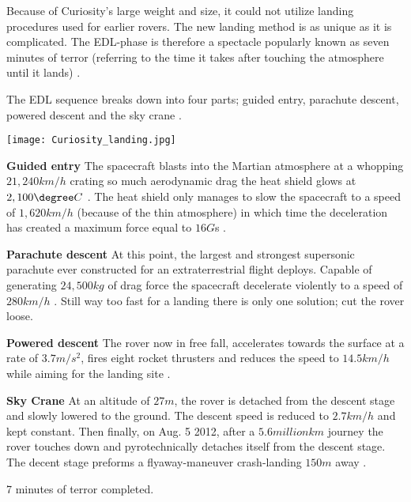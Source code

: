 ﻿\begin{tcolorbox}[colback=red!5,colframe=DarkRed!40!black,title=Entry, Decent and Landing (EDL)]
Because of Curiosity’s large weight and size, it could not utilize landing procedures used for earlier rovers.
The new landing method is as unique as it is complicated.
The EDL-phase is therefore a spectacle popularly known as seven minutes of terror (referring to the time it takes after touching the atmosphere until it lands) \cite{CNN_7minterror}. 

The EDL sequence breaks down into four parts; guided entry, parachute descent, powered descent and the sky crane \cite{NASALanding}.

{\centering
\texttt{[image: Curiosity\_landing.jpg]}
\par}

\textbf{Guided entry}
The spacecraft blasts into the Martian atmosphere at a whopping $21,240km/h$ crating so much aerodynamic drag the heat shield glows at $2,100\degree C$ \cite{NASA_youtube}.
The heat shield only manages to slow the spacecraft to a speed of $1,620km/h$ (because of the thin atmosphere) in which time the deceleration has created a maximum force equal to $16G$s \cite{HistoricLanding} \cite{NASALanding}.

\textbf{Parachute descent}
At this point, the largest and strongest supersonic parachute ever constructed for an extraterrestrial flight deploys. Capable of generating $24,500kg$ of drag force the spacecraft decelerate violently to a speed of $280km/h$ \cite{Parachute} \cite{NASALanding}.
Still way too fast for a landing there is only one solution; cut the rover loose.

\textbf{Powered descent}
The rover now in free fall, accelerates towards the surface at a rate of $3.7m/s^{2}$, fires eight rocket thrusters and reduces the speed to $14.5km/h$ while aiming for the landing site \cite{HistoricLanding} \cite{NASALanding}. 

\textbf{Sky Crane}
At an altitude of $27m$, the rover is detached from the descent stage and slowly lowered to the ground.
The descent speed is reduced to $2.7km/h$ and kept constant.
Then finally, on Aug. 5 2012, after a $5.6 million km$ \cite{CNNCuriosity} journey the rover touches down and pyrotechnically detaches itself from the descent stage.
The decent stage preforms a flyaway-maneuver crash-landing $150m$ away \cite{HistoricLanding} \cite{NASALanding}. 

7 minutes of terror completed.
\end{tcolorbox}